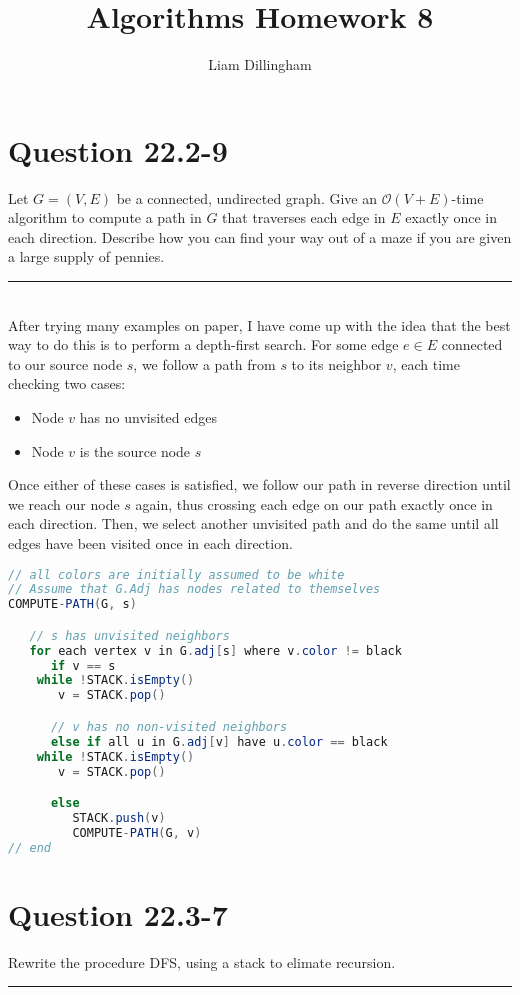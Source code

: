 \documentclass[20pt]{article} %
\title{Algorithms Homework 8}
\author{Liam Dillingham}
\begin{document}
\maketitle

\section{Question 22.2-9} 
Let $G = (V, E)$ be a connected, undirected graph. Give an $\mathcal{O}(V + E)$-time algorithm to compute a path in $G$ that traverses each edge in $E$ exactly once in each direction. Describe how you can find your way out of a maze if you are given a large supply of pennies. \\
\noindent\rule{2cm}{0.4pt} \\

After trying many examples on paper, I have come up with the idea that the best way to do this is to perform a depth-first search.  For some edge $e \in E$ connected to our source node $s$, we follow a path from $s$ to its neighbor $v$, each time checking two cases: 

\begin{itemize}
\item Node $v$ has no unvisited edges
\item Node $v$ is the source node $s$
\end{itemize}

Once either of these cases is satisfied, we follow our path in reverse direction until we reach our node $s$ again, thus crossing each edge on our path exactly once in each direction.  Then, we select another unvisited path and do the same until all edges have been visited once in each direction. 

\newpage
\begin{lstlisting}[language=java]
// all colors are initially assumed to be white
// Assume that G.Adj has nodes related to themselves
COMPUTE-PATH(G, s)

   // s has unvisited neighbors
   for each vertex v in G.adj[s] where v.color != black 
      if v == s
	while !STACK.isEmpty()
	   v = STACK.pop()

      // v has no non-visited neighbors
      else if all u in G.adj[v] have u.color == black 
	while !STACK.isEmpty()
	   v = STACK.pop()

      else
         STACK.push(v)
         COMPUTE-PATH(G, v)
// end
\end{lstlisting}

\newpage
\section{Question 22.3-7} 
Rewrite the procedure DFS, using a stack to elimate recursion. \\
\noindent\rule{2cm}{0.4pt} \\
\end{document}
